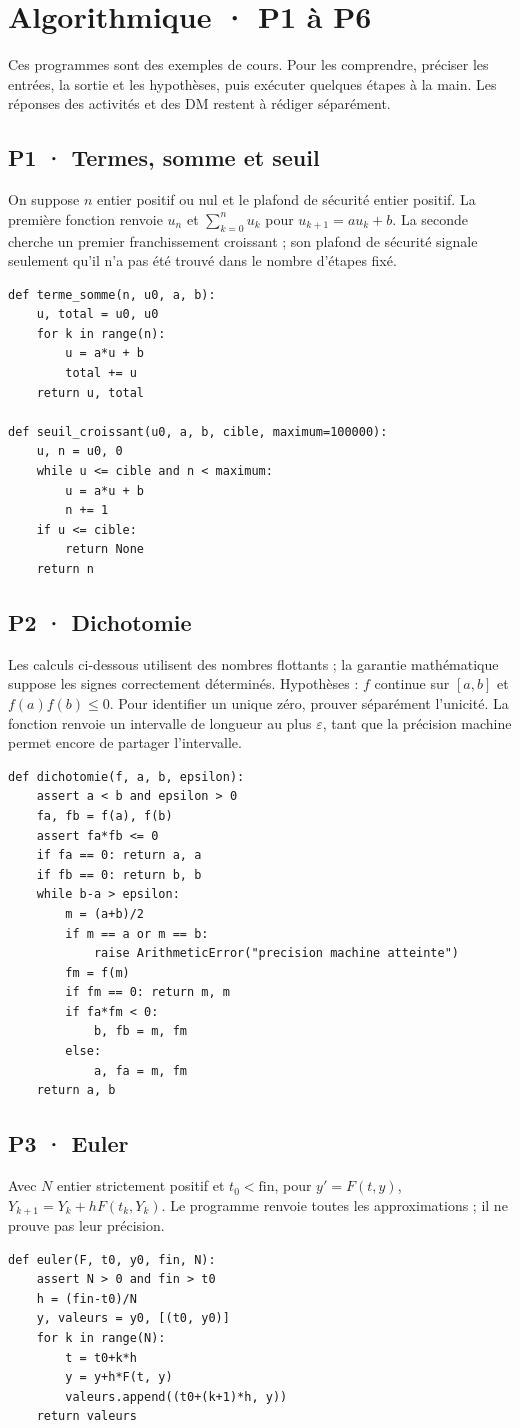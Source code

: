 \chapter{Algorithmique · P1 à P6}
Ces programmes sont des exemples de cours. Pour les comprendre, préciser les entrées, la sortie et les hypothèses, puis exécuter quelques étapes à la main. Les réponses des activités et des DM restent à rédiger séparément.
\section{P1 · Termes, somme et seuil}
On suppose $n$ entier positif ou nul et le plafond de sécurité entier positif. La première fonction renvoie $u_n$ et $\sum_{k=0}^n u_k$ pour $u_{k+1}=au_k+b$. La seconde cherche un premier franchissement croissant ; son plafond de sécurité signale seulement qu'il n'a pas été trouvé dans le nombre d'étapes fixé.
\begin{lstlisting}
def terme_somme(n, u0, a, b):
    u, total = u0, u0
    for k in range(n):
        u = a*u + b
        total += u
    return u, total

def seuil_croissant(u0, a, b, cible, maximum=100000):
    u, n = u0, 0
    while u <= cible and n < maximum:
        u = a*u + b
        n += 1
    if u <= cible:
        return None
    return n
\end{lstlisting}
\section{P2 · Dichotomie}
Les calculs ci-dessous utilisent des nombres flottants ; la garantie mathématique suppose les signes correctement déterminés. Hypothèses : $f$ continue sur $[a,b]$ et $f(a)f(b)\le0$. Pour identifier un unique zéro, prouver séparément l'unicité. La fonction renvoie un intervalle de longueur au plus $\varepsilon$, tant que la précision machine permet encore de partager l'intervalle.
\begin{lstlisting}
def dichotomie(f, a, b, epsilon):
    assert a < b and epsilon > 0
    fa, fb = f(a), f(b)
    assert fa*fb <= 0
    if fa == 0: return a, a
    if fb == 0: return b, b
    while b-a > epsilon:
        m = (a+b)/2
        if m == a or m == b:
            raise ArithmeticError("precision machine atteinte")
        fm = f(m)
        if fm == 0: return m, m
        if fa*fm < 0:
            b, fb = m, fm
        else:
            a, fa = m, fm
    return a, b
\end{lstlisting}
\clearpage\section{P3 · Euler}
Avec $N$ entier strictement positif et $t_0<\text{fin}$, pour $y'=F(t,y)$, $Y_{k+1}=Y_k+hF(t_k,Y_k)$. Le programme renvoie toutes les approximations ; il ne prouve pas leur précision.
\begin{lstlisting}
def euler(F, t0, y0, fin, N):
    assert N > 0 and fin > t0
    h = (fin-t0)/N
    y, valeurs = y0, [(t0, y0)]
    for k in range(N):
        t = t0+k*h
        y = y+h*F(t, y)
        valeurs.append((t0+(k+1)*h, y))
    return valeurs
\end{lstlisting}
